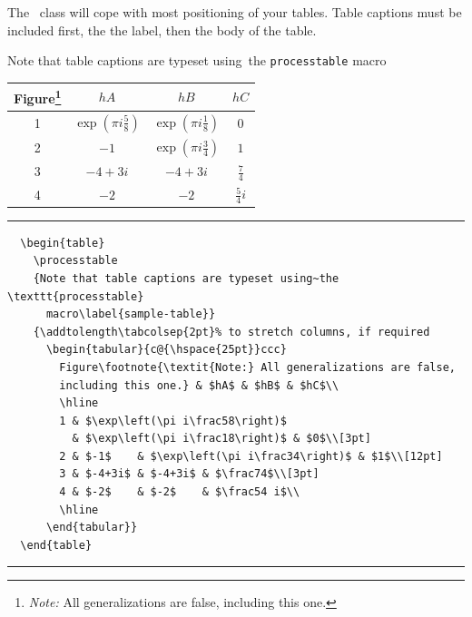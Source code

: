 The \cambridge\ class will cope with most positioning of your tables. Table captions must be included first, the the label, then the body of the table.

  \begin{table}
    \processtable
    {Note that table captions are typeset using~the \texttt{processtable}
      macro\label{sample-table}}
    {\addtolength\tabcolsep{2pt}%
      \begin{tabular}{c@{\hspace{25pt}}ccc}
        Figure\footnote{\textit{Note:} All generalizations are false,
        including this one.} & $hA$ & $hB$ & $hC$\\
        \hline
        1 & $\exp\left(\pi i\frac58\right)$
          & $\exp\left(\pi i\frac18\right)$ & $0$\\[3pt]
        2 & $-1$    & $\exp\left(\pi i\frac34\right)$ & $1$\\[12pt]
        3 & $-4+3i$ & $-4+3i$ & $\frac74$\\[3pt]
        4 & $-2$    & $-2$    & $\frac54 i$\\
        \hline
      \end{tabular}}
  \rule[-20pt]{\textwidth}{0.5pt}
\begin{verbatim}
  \begin{table}
    \processtable
    {Note that table captions are typeset using~the \texttt{processtable}
      macro\label{sample-table}}
    {\addtolength\tabcolsep{2pt}% to stretch columns, if required
      \begin{tabular}{c@{\hspace{25pt}}ccc}
        Figure\footnote{\textit{Note:} All generalizations are false,
        including this one.} & $hA$ & $hB$ & $hC$\\
        \hline
        1 & $\exp\left(\pi i\frac58\right)$
          & $\exp\left(\pi i\frac18\right)$ & $0$\\[3pt]
        2 & $-1$    & $\exp\left(\pi i\frac34\right)$ & $1$\\[12pt]
        3 & $-4+3i$ & $-4+3i$ & $\frac74$\\[3pt]
        4 & $-2$    & $-2$    & $\frac54 i$\\
        \hline
      \end{tabular}}
  \end{table}
\end{verbatim}
  \rule[20pt]{\textwidth}{0.5pt}
  \end{table}



